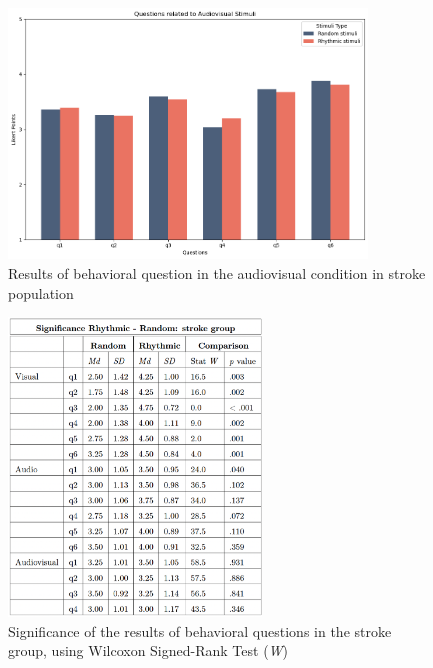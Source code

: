 \begin{figure}[H]
    \centering
    \includegraphics[width=0.85\textwidth]{bar_plots/bar_audvis_s.png}
    \caption{Results of behavioral question in the audiovisual condition in stroke population}
    \label{fig: bar_audiovisual_stroke} 
\end{figure} 
\begin{figure}[H]
    \centering
    \includegraphics[width=0.60\textwidth]{significance_tables/stroke_group.png}
    \caption{Significance of the results of behavioral questions in the stroke group, using Wilcoxon Signed-Rank Test (\textit{W})}
    \label{fig: significance_stroke_pop} 
\end{figure} 

